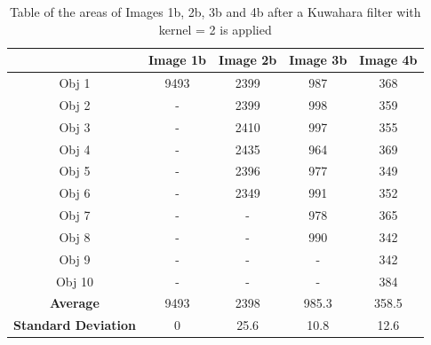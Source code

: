 \documentclass[runningheads]{llncs}
\begin{document}
\begin{table}[h!]
\centering
\begin{tabular}{|c|c|c|c|c|}
\hline
\textbf{} & \textbf{Image 1b} & \textbf{Image 2b} & \textbf{Image 3b} & \textbf{Image 4b} \\
\hline
Obj 1 & 9493      & 2399  & 987 &  368 \\ \hline
Obj 2 &  -          & 2399  & 998 & 359\\ \hline
Obj 3 &   -         & 2410 & 997 &  355\\ \hline
Obj 4 &   -         & 2435  & 964 &  369\\ \hline
Obj 5 &   -         & 2396 &  977 &  349\\ \hline
Obj 6 &   -         & 2349 & 991 &  352\\ \hline
Obj 7 &   -         &  -     & 978 &  365\\ \hline
Obj 8 &   -         &  -     & 990 &  342 \\ \hline
Obj 9 &    -        &  -     &  -    & 342\\ \hline
Obj 10 &  -          &  -     &  -    & 384\\ \hline
\textbf{Average} &   9493  &  2398   &   985.3   & 358.5  \\ \hline
\textbf{Standard Deviation} &  0      &  25.6      &    10.8   & 12.6  \\ \hline
\end{tabular}
\caption{Table of the areas of Images 1b, 2b, 3b and 4b after a Kuwahara filter with kernel = 2 is applied}
\label{tab:Area-SeriesB-Kuwahara2}
\end{table}
\end{document}

